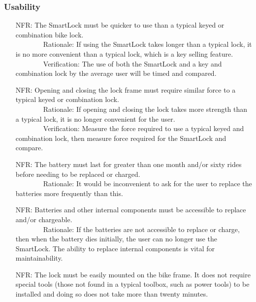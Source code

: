 \documentclass[12pt]{article}
\newcounter{nfrnum} %
\begin{document}
\subsubsection{Usability}
\begin{itemize}
\setlength{\itemindent}{.5in}
\item[NFR\refstepcounter{nfrnum}\thenfrnum\label{NFRCompQuick}:]  The SmartLock must be quicker to use than a typical keyed or combination bike lock.
\\ \-\ \-\ \-\ \-\ \-\ \-\ \-\ \-\ Rationale: If using the SmartLock takes longer than a typical lock, it is no more convenient than a typical lock, which is a key selling feature. 
\\ \-\ \-\ \-\ \-\ \-\ \-\ \-\ \-\ Verification: The use of both the SmartLock and a key and combination lock by the average user will be timed and compared. 
\item[NFR\refstepcounter{nfrnum}\thenfrnum\label{NFRCompForce}:] Opening and closing the lock frame must require similar force to a typical keyed or combination lock.
\\ \-\ \-\ \-\ \-\ \-\ \-\ \-\ \-\ Rationale: If opening and closing the lock takes more strength than a typical lock, it is no longer convenient for the user. 
\\ \-\ \-\ \-\ \-\ \-\ \-\ \-\ \-\ Verification: Measure the force required to use a typical keyed and combination lock, then measure force required for the SmartLock and compare.
\item[NFR\refstepcounter{nfrnum}\thenfrnum\label{NFRBatteryLife}:] The battery must last for greater than one month and/or sixty rides before needing to be replaced or charged.
\\ \-\ \-\ \-\ \-\ \-\ \-\ \-\ \-\ Rationale: It would be inconvenient to ask for the user to replace the batteries more frequently than this.
\item[NFR\refstepcounter{nfrnum}\thenfrnum\label{NFRBatteryAccess}:] Batteries and other internal components must be accessible to replace and/or chargeable.
\\ \-\ \-\ \-\ \-\ \-\ \-\ \-\ \-\ Rationale: If the batteries are not accessible to replace or charge, then when the battery dies initially, the user can no longer use the SmartLock. The ability to replace internal components is vital for maintainability.
\item[NFR\refstepcounter{nfrnum}\thenfrnum\label{NFRTools}:] The lock must be easily mounted on the bike frame. It does not require special tools (those not found in a typical toolbox, such as power tools) to be installed and doing so does not take more than twenty minutes. 

\end{itemize}
\end{document}

